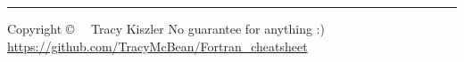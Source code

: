 \documentclass[10pt,landscape]{article}
\begin{document}
\begin{multicols}{3}

\rule{0.3\linewidth}{0.25pt}
\scriptsize

Copyright \copyright\ \the\year ~ Tracy Kiszler
No guarantee for anything :)\\

\href{https://github.com/TracyMcBean/Fortran\_cheatsheet}{https://github.com/TracyMcBean/Fortran\_cheatsheet}


\end{multicols}
\end{document}
